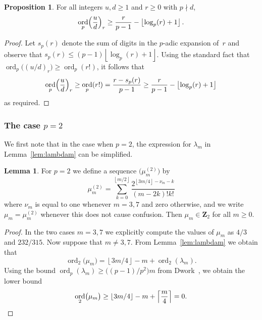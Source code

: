 \documentclass[a4paper,11pt]{article}
\numberwithin{equation}{section}
\providecommand{\floor}[1]{\left\lfloor#1\right\rfloor}   %
\providecommand{\ceil}[1]{\left\lceil#1\right\rceil}   %
\newcommand{\ZZ}{\mathbf{Z}} %
\DeclareMathOperator{\ord}{ord}          %
\theoremstyle{definition}
\newtheorem{lem}[thm]{Lemma}
\newtheorem{prop}[thm]{Proposition}
\begin{document}
\begin{prop} \label{prop:rfac}
For all integers $u, d \geq 1$ and $r \geq 0$ with $p \nmid d$, 
\begin{equation*}
\ord_p\Bigl(\frac{u}{d}\Bigr)_r \geq \frac{r}{p-1} - \floor{\log_p(r) + 1}.
\end{equation*}
\end{prop}

\begin{proof}
Let $s_p(r)$ denote the sum of digits in the $p$-adic expansion of~$r$ 
and observe that $s_p(r) \leq (p-1)\floor{\log_p(r) + 1}$.  Using the standard fact that 
$\ord_p\bigl((u/d)_r\bigr) \geq \ord_p(r!)$, 
it follows that 
\begin{equation*}
\ord_p\Bigl(\frac{u}{d}\Bigr)_r \geq \ord_p(r!) = \frac{r - s_p(r)}{p-1} \geq \frac{r}{p-1} - \floor{\log_p(r) + 1}
\end{equation*}
as required.
\end{proof}

\subsubsection{The case $p = 2$}

We first note that in the case when $p = 2$, the expression for 
$\lambda_m$ in Lemma~\ref{lem:lambdam} can be simplified.

\begin{lem} \label{lem:mu2}
For $p = 2$ we define a sequence $\bigl(\mu_m^{(2)}\bigr)$ by 
\begin{equation}
\mu_m^{(2)} = 
    \sum_{k=0}^{\floor{m/2}} \frac{2^{\floor{3m/4} - \nu_m - k}}{(m-2k)! k!}
\end{equation}
where $\nu_m$ is equal to one whenever $m = 3, 7$ and zero otherwise, 
and we write $\mu_m =\mu_m^{(2)}$ whenever this does not cause confusion. 
Then $\mu_m \in \ZZ_2$ for all $m \geq 0$.
\end{lem}

\begin{proof}
In the two cases $m = 3, 7$ we explicitly compute the values of 
$\mu_m$ as $4/3$ and $232/315$.  Now suppose that $m \neq 3, 7$. 
From Lemma~\ref{lem:lambdam} we obtain that 
\begin{equation*}
\ord_2 \bigl(\mu_m\bigr) 
    = \floor{3m/4} - m + \ord_2(\lambda_m).
\end{equation*}
Using the bound $\ord_p(\lambda_m) \geq \bigl((p-1)/p^2\bigr) m$ from 
Dwork~\citep[pp.~55--57]{Dwork1962}, we obtain the lower bound 
\begin{equation*}
\ord_2 \bigl(\mu_m\bigr) 
    \geq \floor{3m/4} - m + \ceil{\frac{m}{4}} = 0. \qedhere
\end{equation*}
\end{proof}
\end{document}
